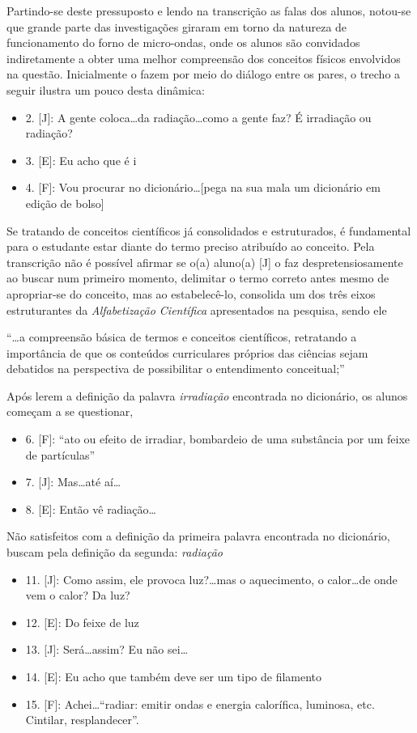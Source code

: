 Partindo-se deste pressuposto e lendo na transcrição as falas dos alunos, notou-se que grande parte das investigações giraram em torno da natureza de funcionamento do forno de micro-ondas, onde os alunos são convidados indiretamente a  obter uma melhor compreensão dos conceitos físicos envolvidos na questão. Inicialmente o fazem por meio do diálogo entre os pares, o trecho a seguir ilustra um pouco desta dinâmica:
\begin{itemize}
    \item 2. [J]: A gente coloca\ldots da radiação\ldots como a gente faz? É irradiação ou radiação?
    \item 3. [E]: Eu acho que é i
    \item 4. [F]: Vou procurar no dicionário\ldots [pega na sua mala um dicionário em edição de bolso]    
\end{itemize}
Se tratando de conceitos científicos já consolidados e estruturados, é fundamental para o estudante estar diante do termo preciso atribuído ao conceito. Pela transcrição não é possível afirmar se o(a) aluno(a) [J] o faz despretensiosamente ao buscar num primeiro momento, delimitar o termo correto antes mesmo de apropriar-se do conceito, mas ao estabelecê-lo, consolida um dos três eixos estruturantes da \emph{Alfabetização Científica} apresentados na pesquisa, sendo ele
\begin{citacao}
    ``\ldots a compreensão básica de termos e conceitos científicos, retratando a importância de que os conteúdos curriculares próprios das ciências sejam debatidos na perspectiva de possibilitar o entendimento conceitual;'' 
\end{citacao}
Após lerem a definição da palavra \emph{irradiação} encontrada no dicionário, os alunos começam a se questionar,
\begin{itemize}
    \item 6. [F]: “ato ou efeito de irradiar, bombardeio de uma substância por um feixe de partículas”
    \item 7. [J]: Mas\ldots até aí\ldots 
    \item 8. [E]: Então vê radiação\ldots
\end{itemize}
Não satisfeitos com a definição da primeira palavra encontrada no dicionário, buscam pela definição da segunda: \emph{radiação} 
\begin{itemize}
    \item 11. [J]: Como assim, ele provoca luz?\ldots mas o aquecimento, o calor\ldots de onde vem o calor? Da luz?
    \item 12. [E]: Do feixe de luz
    \item 13. [J]: Será\ldots assim? Eu não sei\ldots 
    \item 14. [E]: Eu acho que também deve ser um tipo de filamento
    \item 15. [F]: Achei\ldots “radiar: emitir ondas e energia calorífica, luminosa, etc. Cintilar, resplandecer”.
\end{itemize}
